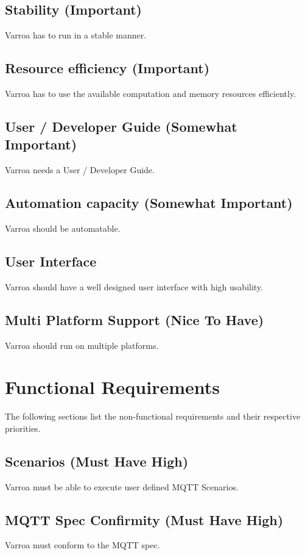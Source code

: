 \subsection{Stability (Important)} 
Varroa has to run in a stable manner.

\subsection{Resource efficiency (Important)} 
Varroa has to use the available computation and memory resources efficiently.

\subsection{User / Developer Guide (Somewhat Important)} 
Varroa needs a User / Developer Guide.

\subsection{Automation capacity (Somewhat Important)} 
Varroa should be automatable.

\subsection{User Interface}
Varroa should have a well designed user interface with high usability.

\subsection{Multi Platform Support (Nice To Have)}
Varroa should run on multiple platforms.

\section{Functional Requirements}
The following sections list the non-functional requirements and their respective priorities.

\subsection{Scenarios (Must Have High)}
Varroa must be able to execute user defined MQTT Scenarios.

\subsection{MQTT Spec Confirmity (Must Have High)}
Varroa must conform to the MQTT spec.

